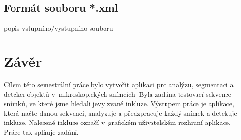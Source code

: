 \documentclass[12pt, a4paper]{report}
\begin{document}
	\section{Formát souboru *.xml}
	popis vstupního/výstupního souboru

\chapter{Závěr}
Cílem této semestrální práce bylo vytvořit aplikaci pro analýzu, segmentaci a detekci objektů v~mikroskopických snímcích. Byla zadána testovací sekvence snímků, ve které jsme hledali jevy zvané inkluze. Výstupem práce je aplikace, která načte danou sekvenci, analyzuje a předzpracuje každý snímek a detekuje inkluze. Nalezené inkluze označí v~grafickém uživatelském rozhraní aplikace. Práce tak splňuje zadání.
\end{document}
